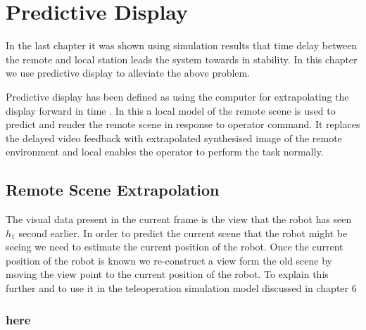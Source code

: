 \chapter{Predictive Display}
In the last chapter it was shown using simulation results that time delay between the remote and local station leads the system towards in stability. In this chapter we use predictive display to alleviate the above problem.


Predictive display has been defined as using the computer for extrapolating the display forward in time \cite{sheridan}. In this a local model of the remote scene is used to predict and render the remote scene in response to operator command. It replaces the delayed video feedback with extrapolated synthesised  image of the remote environment and local enables the operator to perform the task normally. 

\section{Remote Scene Extrapolation} 
The visual data present in the current frame is the view that the robot has seen $h_1$ second earlier. In order to predict the current scene that the robot might be seeing we need to estimate the current position of the robot. Once the current position of the robot is known we re-construct a view form the old scene by moving the view point to the current position of the robot. To explain this further and to use it in the teleoperation simulation model discussed in chapter 6
\subsection{here}

